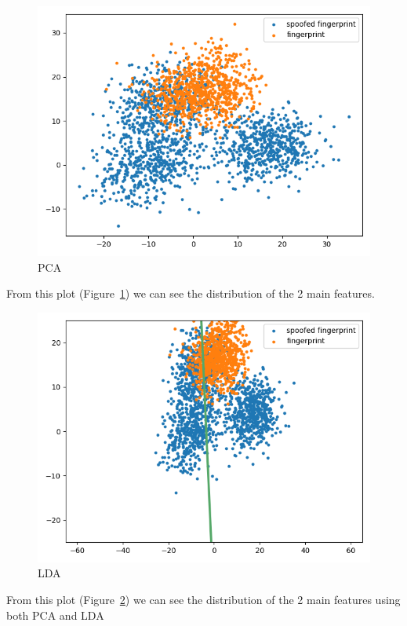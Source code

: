 \documentclass[english]{report}
\begin{document}
    \begin{figure}[H]
        \centering
        \includegraphics[scale=0.5]{../../images/feature_plot/PCA_m=2}
        \caption{PCA}
        \label{fig:PCA}
    \end{figure}

    From this plot (Figure~\ref{fig:PCA}) we can see the distribution of the 2 main features.

    \begin{figure}[H]
        \centering
        \includegraphics[scale=0.5]{../../images/feature_plot/PCA_m=2 + LDA}
        \caption{LDA}
        \label{fig:LDA}
    \end{figure}

    From this plot (Figure~\ref{fig:LDA}) we can see the distribution of the 2 main features using both PCA and LDA
\end{document}
